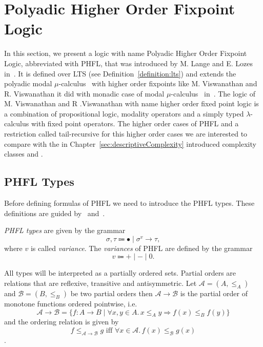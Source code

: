 

\section{Polyadic Higher Order Fixpoint Logic}\label{sec:polyadichigherorderfixpointlogic}

In this section, we present a logic with name Polyadic Higher Order Fixpoint Logic, abbreviated with PHFL, that was
introduced by M. Lange and E. Lozes in~\cite{lange2014capturing}. It is defined over LTS (see
Definition~\ref{definition:lts}) and extends the polyadic modal $\mu$-calculus~\cite{otto1999bisimulation} with
higher order fixpoints like M. Viswanathan and R. Viswanathan it did with monadic case of modal
$\mu$-calculus~\cite{kozen1983results} in~\cite{viswanathan2004higher}. The logic of M. Viswanathan and R
.Viswanathan with name higher order fixed point logic is a combination of propositional logic, modality operators and
a simply typed $\lambda$-calculus with fixed point operators. The higher order cases of PHFL and a restriction called
tail-recursive for this higher order cases we are interested to compare with the in
Chapter~\ref{sec:descriptiveComplexity} introduced complexity classes  and .

\subsection{PHFL Types}\label{subsec:phflTypes}

Before defining formulas of PHFL we need to introduce the PHFL types. These definitions are guided
by~\cite{viswanathan2004higher} and~\cite{lange2014capturing}.

\begin{definition}
    \emph{PHFL types} are given by the grammar
    \[\sigma, \tau \Coloneqq \bullet \mid \sigma^v \rightarrow \tau,\]
    where $v$ is called \textit{variance}. The \emph{variances} of PHFL are defined by the grammar
    \[v \Coloneqq + \mid - \mid 0.\]
\end{definition}

All types will be interpreted as a partially ordered sets. Partial orders are relations that are reflexive, transitive
and antisymmetric. Let $\mathcal{A} = (A, \leq_A)$ and $\mathcal{B} = (B, \leq_B)$ be two partial orders then
$\mathcal{A} \rightarrow \mathcal{B}$ is the partial order of monotone functions ordered pointwise, i.e.
\[\mathcal{A} \rightarrow \mathcal{B} = \{f\colon A\rightarrow B \mid \forall x,y \in A.\,x\leq_A y\Rightarrow f(x)
\leq_B f(y)\}\]
and the ordering relation is given by
\[f \leq_{\mathcal{A}\rightarrow\mathcal{B}} g\text{ iff } \forall x\in \mathcal{A}.\,f(x) \leq_{\mathcal{B}} g(x)\].

